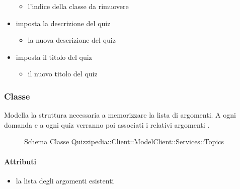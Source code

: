 \begin{itemize}
\begin{itemize}
\item {}
\newline
l'indice della classe da rimuovere
\end{itemize}
\item {}
\newline
imposta la descrizione del quiz
\newline
{}
\newline
\begin{itemize}
\item {}
\newline
la nuova descrizione del quiz
\end{itemize}
\item {}
\newline
imposta il titolo del quiz
\newline
{}
\newline
\begin{itemize}
\item {}
\newline
il nuovo titolo del quiz
\end{itemize}
\end{itemize}
\subsubsection{Classe }
Modella la struttura necessaria a memorizzare la lista di argomenti. A ogni domanda e a ogni quiz verranno poi associati i relativi argomenti .
\begin{figure}[H]
\centering
\noindent{}
\caption[Schema Classe Topics]{Schema Classe Quizzipedia::Client::ModelClient::Services::Topics}
\end{figure}
\paragraph{Attributi}
\begin{itemize}
\item {}
\newline
la lista degli argomenti esistenti
\end{itemize}
